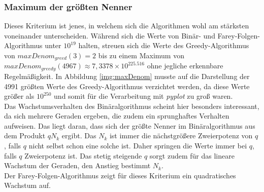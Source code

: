 \subsubsection{Maximum der größten Nenner}
Dieses Kriterium ist jenes, in welchem sich die Algorithmen wohl am stärksten voneinander unterscheiden. Während sich die Werte von Binär- und Farey-Folgen-Algorithmus unter $10^{19}$ halten, streuen sich die Werte des Greedy-Algorithmus von $maxDenom_{greed}(3) = 2$ bis zu einem Maximum von $maxDenom_{greedy}(4967) \approx 7,3378 \times 10^{225.516}$ ohne jegliche erkennbare Regelmäßigkeit. In Abbildung \ref{img:maxDenom} musste auf die Darstellung der 4991 größten Werte des Greedy-Algorithmus verzichtet werden, da diese Werte größer als $10^{250}$ und somit für die Verarbeitung mit \emph{pyplot} zu groß waren.\\
Das Wachstumsverhalten des Binäralgorithmus scheint hier besonders interessant, da sich mehrere Geraden ergeben, die zudem ein sprunghaftes Verhalten aufweisen. Das liegt daran, dass sich der größte Nenner im Binäralgorithmus aus dem Produkt $qN_k$ ergibt. Das $N_k$ ist immer die nächstgrößere Zweierpotenz von $q$, falls $q$ nicht selbst schon eine solche ist. Daher springen die Werte immer bei $q$, falls $q$ Zweierpotenz ist. Das stetig steigende $q$ sorgt zudem für das lineare Wachstum der Geraden, den Anstieg bestimmt $N_k$.\\
Der Farey-Folgen-Algorithmus zeigt für dieses Kriterium ein quadratisches Wachstum auf.



